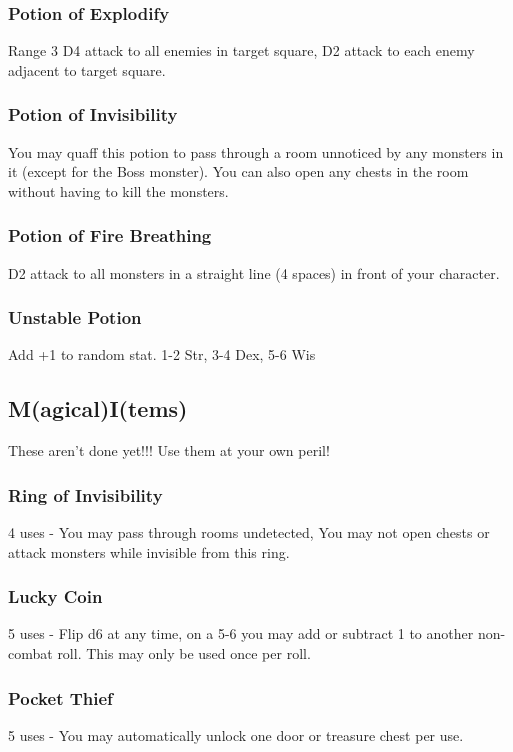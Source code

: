 \documentclass[a6paper,hidelinks]{article}
\begin{document}
\subsubsection{Potion of Explodify}
Range 3 D4 attack to all enemies in target square, D2 attack to each enemy adjacent to target square.

\subsubsection{Potion of Invisibility}

You may quaff this potion to pass through a room unnoticed by any monsters in it (except for the Boss monster). You can also open any chests in the room without having to kill the monsters.

\subsubsection{Potion of Fire Breathing}

D2 attack to all monsters in a straight line (4 spaces) in front of your character.

\subsubsection{Unstable Potion}

Add +1 to random stat. 1-2 Str, 3-4 Dex, 5-6 Wis

\subsection{M(agical)I(tems)}

These aren’t done yet!!! Use them at your own peril!

\subsubsection{Ring of Invisibility}

4 uses - You may pass through rooms undetected, You may not open chests or attack monsters while invisible from this ring.

\subsubsection{Lucky Coin}
5 uses - Flip d6 at any time, on a 5-6 you may add or subtract 1 to another non-combat roll. This may only be used once per roll.

\subsubsection{Pocket Thief}
5 uses - You may automatically unlock one door or treasure chest per use.
\end{document}
